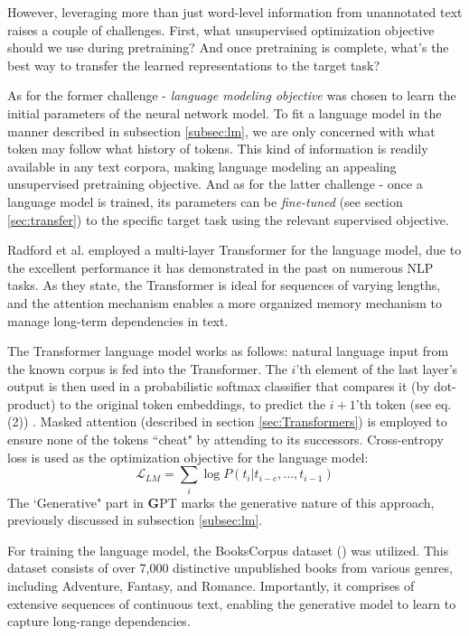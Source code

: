 \documentclass{article}
\begin{document}
\medskip
\noindent
However, leveraging more than just word-level information from unannotated text raises a couple of challenges. First, what unsupervised optimization objective should we use during pretraining? And once pretraining is complete, what's the best way to transfer the learned representations to the target task?

\medskip
\noindent
As for the former challenge - \emph{language modeling objective} was chosen to learn the initial parameters of the neural network model. To fit a language model in the manner described in subsection \ref{subsec:lm}, we are only concerned with what token may follow what history of tokens. This kind of information is readily available in any text corpora, making language modeling an appealing unsupervised pretraining objective. And as for the latter challenge - once a language model is trained, its parameters can be \emph{fine-tuned} (see section \ref{sec:transfer}) to the specific target task using the relevant supervised objective.

\medskip
\noindent
Radford et al. employed a multi-layer Transformer for the language model, due to the excellent performance it has  demonstrated in the past on numerous NLP tasks. As they state, the Transformer is ideal for sequences of varying lengths, and the attention mechanism enables a more organized memory mechanism to manage long-term dependencies in text.

\medskip
\noindent
The Transformer language model works as follows: natural language input from the known corpus is fed into the Transformer. The $i$'th element of the last layer's output is then used in a probabilistic softmax classifier that compares it (by dot-product) to the original token embeddings, to predict the $i+1$'th token (see eq. (2)) . Masked attention (described in section \ref{sec:Transformers}) is employed to ensure none of the tokens ``cheat" by attending to its successors. Cross-entropy loss is used as the optimization objective for the language model:
\begin{equation*}
    \mathcal{L}_{LM} = \sum_i\log{P(t_i|t_{i-c},...,t_{i-1})}
\end{equation*}
The `Generative" part in \textbf{G}PT marks the generative nature of this approach, previously discussed in subsection \ref{subsec:lm}.

\medskip
\noindent
For training the language model, the BooksCorpus dataset (\citet{zhu2015books}) was utilized. This dataset consists of over 7,000 distinctive unpublished books from various genres, including Adventure, Fantasy, and Romance. Importantly, it comprises of extensive sequences of continuous text, enabling the generative model to learn to capture long-range dependencies.
\end{document}
